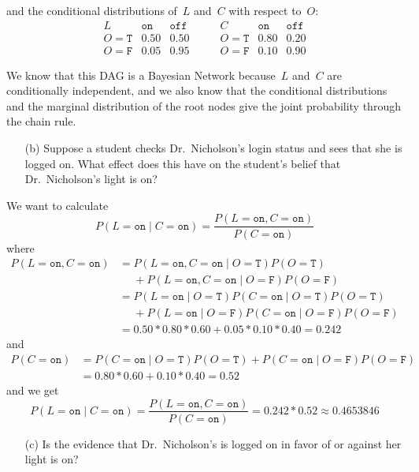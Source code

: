 \documentclass[a4paper]{article}
\newcommand{\T}{\texttt{T}}
\newcommand{\F}{\texttt{F}}
\newcommand{\on}{\texttt{on}}
\begin{document}
and the conditional distributions of~\(L\) and~\(C\) with respect to~\(O\):
\[
    \begin{array}{c|cc}
        L              & \texttt{on} & \texttt{off} \\ \hline
        O = \texttt{T} & 0.50        & 0.50 \\
        O = \texttt{F} & 0.05        & 0.95
    \end{array}
    \qquad
    \begin{array}{c|cc}
        C              & \texttt{on} & \texttt{off} \\ \hline
        O = \texttt{T} & 0.80        & 0.20 \\
        O = \texttt{F} & 0.10        & 0.90
    \end{array}
\]

We know that this DAG is a Bayesian Network because~\(L\) and~\(C\) are
conditionally independent, and we also know that the conditional distributions
and the marginal distribution of the root nodes give the joint probability
through the chain rule.

\begin{enumerate}
    \item[(b)] Suppose a student checks Dr.\ Nicholson's login status and sees
        that she is logged on. What effect does this have on the student's
        belief that Dr.\ Nicholson's light is on?
\end{enumerate}

We want to calculate
\[
    P(L = \on \mid C = \on) = \frac{P(L = \on, C = \on)}{P(C = \on)}
\]
where
\begin{align*}
    P(L = \on, C = \on) &= P(L = \on, C = \on \mid O = \T)P(O = \T) \\
                        &\phantom{=}+ P(L = \on, C = \on \mid O = \F)P(O = \F) \\
                        &= P(L = \on \mid O = \T)P(C = \on \mid O = \T)P(O = \T) \\
                        &\phantom{=}+ P(L = \on \mid O = \F)P(C = \on \mid O = \F)P(O = \F) \\
                        &= 0.50 * 0.80 * 0.60 + 0.05 * 0.10 * 0.40 = 0.242
\end{align*}
and
\begin{align*}
    P(C = \on) &= P(C = \on \mid O = \T)P(O = \T) + P(C = \on \mid O = \F)P(O = \F) \\
               &= 0.80 * 0.60 + 0.10 * 0.40 = 0.52
\end{align*}
and we get
\[
    P(L = \on \mid C = \on) = \frac{P(L = \on, C = \on)}{P(C = \on)} = 0.242 * 0.52 \approx 0.4653846
\]

\begin{enumerate}
    \item[(c)] Is the evidence that Dr.\ Nicholson's is logged on in favor of or
        against her light is on?
\end{enumerate}
\end{document}
